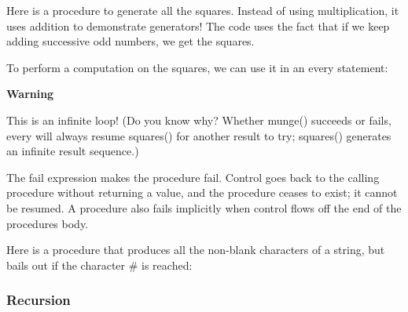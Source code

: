 Here is a procedure to generate all the squares. Instead of using
multiplication, it uses addition to demonstrate generators! The code
uses the fact that if we keep adding successive odd numbers, we get the
squares.


To perform a computation on the squares, we can use it in an
\textsf{every} statement:


{\sffamily\bfseries
Warning}

{\sffamily
This is an infinite loop! (Do you know why? Whether munge() succeeds or
fails, \textrm{every} will always resume squares() for another result
to try; squares() generates an infinite result sequence.)}

The \textsf{fail} expression makes the
procedure fail. Control goes back to the calling procedure without
returning a value, and the procedure ceases to exist; it cannot be
resumed. A procedure also fails implicitly when control flows off the
end of the procedure{\textquotesingle}s body.

Here is a procedure that produces all the non-blank characters of a
string, but bails out if the character \textsf{\#} is reached:


\subsubsection[Recursion]{Recursion}

